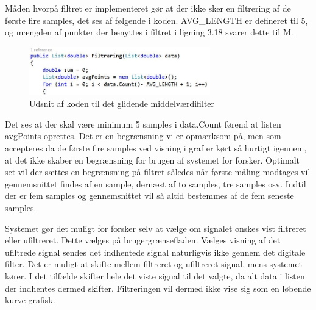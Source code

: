 Måden hvorpå filtret er implementeret gør at der ikke sker en filtrering af de første fire samples, det ses af følgende i koden. AVG\_LENGTH er defineret til 5, og mængden af punkter der benyttes i filtret i ligning 3.18 svarer dette til M.

\begin{figure}[H]
	\centering
	\includegraphics[width=0.7\textwidth]{Figurer/UdsnitFilter}
	\caption{Udsnit af koden til det glidende middelværdifilter}
\end{figure}

Det ses at der skal være minimum 5 samples i data.Count førend at listen avgPoints oprettes. Det er en begrænsning vi er opmærksom på, men som accepteres da de første fire samples ved visning i graf er kørt så hurtigt igennem, at det ikke skaber en begrænsning for brugen af systemet for forsker. Optimalt set vil der sættes en begrænsning på filtret således når første måling modtages vil gennemsnittet findes af en sample, dernæst af to samples, tre samples osv. Indtil der er fem samples og gennemsnittet vil så altid bestemmes af de fem seneste samples. 

Systemet gør det muligt for forsker selv at vælge om signalet ønskes vist filtreret eller ufiltreret. Dette vælges på brugergrænsefladen. Vælges visning af det ufiltrede signal sendes det indhentede signal naturligvis ikke gennem det digitale filter. Det er muligt at skifte mellem filtreret og ufiltreret signal, mens systemet kører. I det tilfælde skifter hele det viste signal til det valgte, da alt data i listen der indhentes dermed skifter. Filtreringen vil dermed ikke vise sig som en løbende kurve grafisk.

